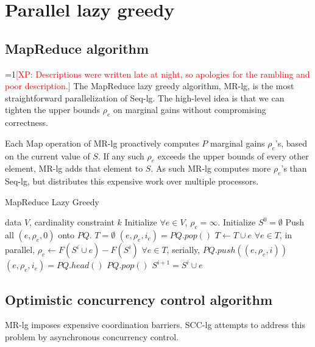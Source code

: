 \documentclass{article}
\newcommand{\Comments}{1}
\newcommand{\note}[2]{\ifnum\Comments=1\textcolor{#1}{#2}\fi}
\newcommand{\xinghao}[1]{\note{red}{[XP: #1]}}
\newcommand{\seqlz}{Seq-lg}
\newcommand{\mrlz}{MR-lg}
\newcommand{\occlz}{SCC-lg}
\begin{document}
\section{Parallel lazy greedy}
\label{sec:parlazy}

\subsection{MapReduce algorithm}
\xinghao{Descriptions were written late at night, so apologies for the rambling and poor description.}
The MapReduce lazy greedy algorithm, \mrlz{}, is the most straightforward parallelization of \seqlz{}.
The high-level idea is that we can tighten the upper bounds $\rho_e$ on marginal gains without compromising correctness.

Each Map operation of \mrlz{} proactively computes $P$ marginal gains $\rho_e$'s, based on the current value of $S$.
If any such $\rho_e$ exceeds the upper bounds of every other element, \mrlz{} adds that element to $S$.
As such \mrlz{} computes more $\rho_e$'s than \seqlz{}, but distributes this expensive work over multiple processors.
\begin{algorithm}[tb]
  \caption{MapReduce Lazy Greedy}
  \label{alg:mrlz}
\begin{algorithmic}[1]
   data $V$, cardinality constraint $k$
  \STATE Initialize $\forall e \in V$, $\rho_e = \infty$.
  \STATE Initialize $S^0 = \emptyset$
  \STATE Push all $(e, \rho_e, 0)$ onto $PQ$.
      \STATE $T = \emptyset$
        \STATE $(e, \rho_e, i_e) = PQ.pop()$
        \STATE $T \leftarrow T \cup e$
      \ENDFOR
      \STATE $\forall e \in T$, in parallel, $\rho_e \leftarrow F(S^i\cup e) - F(S^i)$
      \STATE $\forall e \in T$, serially, $PQ.push((e, \rho_e, i))$
      \STATE $(e, \rho_e, i_e) = PQ.head()$
        \STATE $PQ.pop()$
        \STATE $S^{i+1} = S^i \cup e$
      \ENDIF
    \ENDWHILE
  \ENDFOR
\end{algorithmic}
\end{algorithm}



\subsection{Optimistic concurrency control algorithm}
\mrlz{} imposes expensive coordination barriers.
\occlz{} attempts to address this problem by asynchronous concurrency control.
\end{document}
